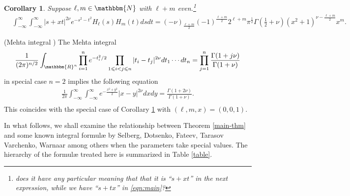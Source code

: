 \documentclass[12pt]{article}
\numberwithin{equation}{section}
\newtheorem{corollary}{Corollary}[section]
{\theorembodyfont{\rmfamily}\newtheorem{example}[corollary]{Example}}
\begin{document}
\begin{corollary}
  \label{cor:Hermite}Suppose $\ell, m \in \mathbbm{N}$ with $\ell + m$
  even.\footnote{does it have any particular meaning that that it is ``$s+xt$'' in the next expression, while we have ``$s+tx$''
	  in \eqref{eqn:main}?}
  \begin{eqnarray}
    & \displaystyle\int_{- \infty}^{\infty} \displaystyle\int_{- \infty}^{\infty} | s+xt |^{2 \nu}
    e^{- s^2 - t^2} H_{\ell} (s) H_m (t) d s d t = (- \nu)_{\frac{\ell +
    m}{2}} (- 1)^{\frac{\ell + m}{2}} 2^{\ell + m} \pi^{\frac{1}{2}} \Gamma
    \left( \frac{1}{2} + \nu \right) (x^2 + 1)^{\nu - \frac{\ell + m}{2}} x^m
    . &  \nonumber
  \end{eqnarray}
\end{corollary}

\begin{example}
  (Mehta integral {\cite{mehta2004random}}) The Mehta integral
  \begin{equation*}
     \frac{1}{(2 \pi)^{n / 2}} \displaystyle\int_{\mathbbm{R}^n} \displaystyle\prod_{i = 1}^n e^{-
    t_i^2 / 2}_{} \displaystyle\prod_{1 \leqslant i < j \leqslant n} | t_i - t_j |^{2 \nu}
    d t_1 \cdots d t_n
     = \displaystyle\prod_{j = 1}^n \frac{\Gamma (1 + j \nu)}{\Gamma (1 + \nu)}
  \end{equation*}
  in special case $n = 2$ implies the following equation
  \begin{eqnarray}
    & \displaystyle\frac{1}{2 \pi} \displaystyle\int_{- \infty}^{\infty} \displaystyle\int_{- \infty}^{\infty} e^{-
    \frac{x^2 + y^2}{2}} | x - y |^{2 \nu} d x d y = \frac{\Gamma (1 + 2
    \nu)}{\Gamma (1 + \nu)} . &  \nonumber\\
    &  &  \nonumber
  \end{eqnarray}
  This coincides with the special case of Corollary \ref{cor:Hermite} with
  $(\ell, m, x) = (0, 0, 1)$.
\end{example}

In what follows, we shall examine the relationship between Theorem
\ref{main-thm} and some known integral formul{\ae} by Selberg, Dotsenko,
Fateev, Tarasov Varchenko, Warnaar among others when the parameters take
special values. The hierarchy of the formul{\ae} treated here is summarized in
Table \ref{table}.
\end{document}
